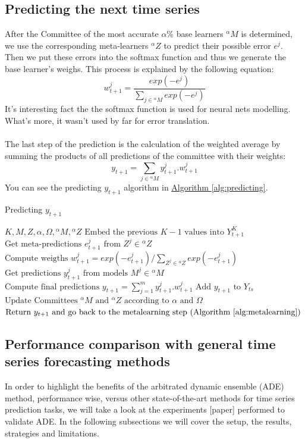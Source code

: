 \documentclass[runningheads,a4paper]{llncs}[2015/06/24]
\begin{document}
\subsection{Predicting the next time series}
 After the Committee of the most accurate $\alpha$\% base learners ${}^{\alpha}M$  is determined, we use the corresponding meta-learners ${}^{\alpha}Z$ to predict their possible error $e^j$. Then we put these errors into the softmax function and thus we generate the base learner's weighs\cite{VtorCerqueira2017}. This process is explained by the following equation:
 \begin{equation}
w^{j}_{t+1} = \frac{exp(-e^{j})}{\sum_{j \in {}^{\alpha}M} exp(-e^{j})}
\end{equation} It's interesting fact the the softmax function is used for neural nets modelling. What's more, it wasn't used by far for error translation.\\\\ The last step of the prediction is the calculation of the weighted average by summing the products of all predictions of the committee with their weights:
 \begin{equation}
y_{t+1} = \sum_{j \in {}^{\alpha}M} y^{j}_{t+1}.w^{j}_{t+1}
\end{equation}You can see the predicting $y_{t+1}$ algorithm in \hyperref[alg:predicting]{Algorithm  \ref{alg:predicting}}.


\begin{algorithm}[h]
\caption{Predicting $y_{t+1}$}
\label{alg:predicting}
\begin{algorithmic}[1]
\Require $K, M, Z,\alpha, \Omega, {}^{\alpha}M, {}^{\alpha}Z$
\State $\text{Embed the previous $K-1$ values  into $Y_{t+1}^{K}$}$
\State $\text{Get meta-predictions $e^{j}_{t+1}$ from $Z^{j} \in {}^{\alpha}Z$}$
\State $\text{Compute weigths $w^{j}_{t+1} =  exp(-e^{j}_{t+1})/\sum_{Z^{j} \in {}^{\alpha}Z} exp(-e^{j}_{t+1})$}$
\State $\text{Get predictions $y^{j}_{t+1} $ from models $M^{j} \in {}^{\alpha}M$}$
\State $\text{Compute final predictions $y_{t+1} = \sum_{j=1}^{m} y^{j}_{t+1}.w^{j}_{t+1}$}$
\State $\text{Add $y_{t+1}$ to $Y_{ts}$}$
\State $\text{Update Committees ${}^{\alpha}M$ and ${}^{\alpha}Z$ according to $\alpha$ and $\Omega$}$
\State $\text{Return $y_{t+1}$ and go back to the metalearning step (Algorithm \ref{alg:metalearning})}$
\end{algorithmic}
\end{algorithm}

\subsection{Performance comparison with general time series forecasting methods}
In order to highlight the benefits of the arbitrated dynamic ensemble (ADE) method, performance wise, versus other state-of-the-art methods for time series prediction tasks, we will take a look at the experiments [paper] performed to validate ADE. In the following subsections we will cover the setup, the results, strategies and limitations.
\end{document}

